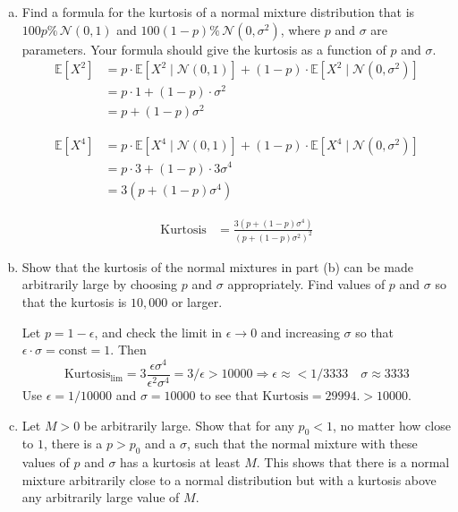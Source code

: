 \documentclass{article}
\begin{document}
\begin{enumerate}[(a)]
    \item Find a formula for the kurtosis of a normal mixture distribution that is $100p\%\, \mathcal{N}(0,1)$ and $100(1 - p)\%\, \mathcal{N}(0, \sigma^2)$, where $p$ and $\sigma$ are parameters. Your formula should give the kurtosis as a function of $p$ and $\sigma$.
          \[
              \begin{aligned}
                  \mathbb{E}[X^2]
                   & = p \cdot \mathbb{E}[X^2 \mid \mathcal{N}(0,1)]
                  + (1 - p) \cdot \mathbb{E}[X^2 \mid \mathcal{N}(0,\sigma^2)] \\
                   & = p \cdot 1 + (1 - p) \cdot \sigma^2                      \\
                   & = p + (1 - p)\sigma^2
              \end{aligned}
          \]

          \[
              \begin{aligned}
                  \mathbb{E}[X^4]
                   & = p \cdot \mathbb{E}[X^4 \mid \mathcal{N}(0,1)]
                  + (1 - p) \cdot \mathbb{E}[X^4 \mid \mathcal{N}(0,\sigma^2)] \\
                   & = p \cdot 3 + (1 - p) \cdot 3\sigma^4                     \\
                   & = 3\left( p + (1 - p)\sigma^4 \right)
              \end{aligned}
          \]

          \[
              \begin{aligned}
                  \text{Kurtosis}
                   & = \frac{3\left( p + (1 - p)\sigma^4 \right)}
                  {\left( p + (1 - p)\sigma^2 \right)^2}
              \end{aligned}
          \]

    \item Show that the kurtosis of the normal mixtures in part (b) can be made arbitrarily large by choosing $p$ and $\sigma$ appropriately. Find values of $p$ and $\sigma$ so that the kurtosis is $10,\!000$ or larger.

          Let $p=1-\epsilon$, and check the limit in $\epsilon \to 0$ and increasing $\sigma$ so that $\epsilon \cdot \sigma = \text{const} = 1$. Then
          \[
              \text{Kurtosis}_{\text{lim}} = 3\frac{\epsilon\sigma^4}
              {\epsilon^2\sigma^4} = 3/\epsilon > 10000 \Rightarrow \epsilon \approx < 1/3333\quad\sigma \approx 3333
          \]
          Use $\epsilon = 1/10000$ and $\sigma = 10000$ to see that $\text{Kurtosis} = 29994.>10000$.
    \item Let $M > 0$ be arbitrarily large. Show that for any $p_0 < 1$, no matter how close to $1$, there is a $p > p_0$ and a $\sigma$, such that the normal mixture with these values of $p$ and $\sigma$ has a kurtosis at least $M$. This shows that there is a normal mixture arbitrarily close to a normal distribution but with a kurtosis above any arbitrarily large value of $M$.


\end{enumerate}
\end{document}
